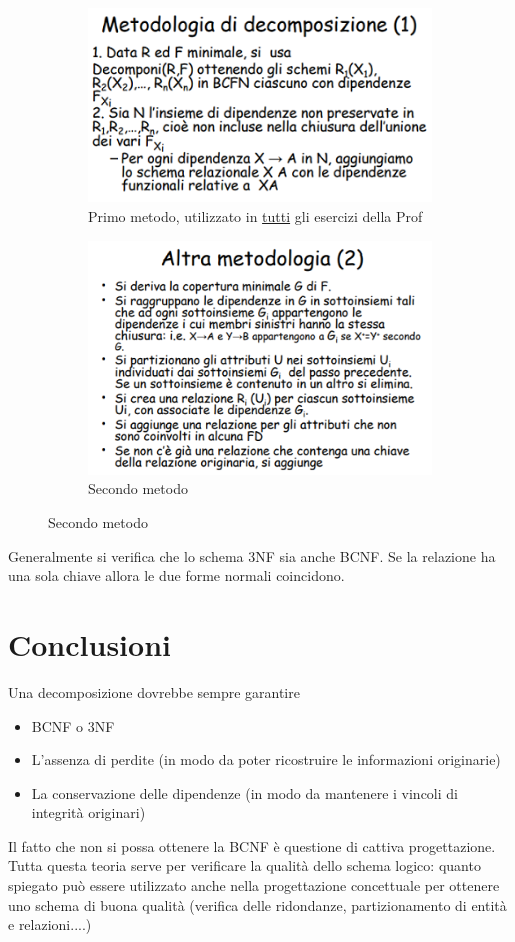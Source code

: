 \begin{figure}[h]
	\begin{subfigure}{0.5\textwidth}
		\includegraphics{images/184.PNG} 
		\caption{Primo metodo, utilizzato in \underline{tutti} gli esercizi della Prof}
	\end{subfigure}
	\begin{subfigure}{0.5\textwidth}
		\includegraphics{images/185.PNG}
		\caption{Secondo metodo}
	\end{subfigure}
\end{figure}

Generalmente si verifica che lo schema 3NF sia anche BCNF. Se la relazione ha una sola chiave allora le due forme normali coincidono.
\section{Conclusioni}
Una decomposizione dovrebbe sempre garantire
\begin{itemize}
	\item BCNF o 3NF
	\item L'assenza di perdite (in modo da poter ricostruire le informazioni originarie)
	\item La conservazione delle dipendenze (in modo da mantenere i vincoli di integrità originari)
\end{itemize}
Il fatto che non si possa ottenere la BCNF è questione di cattiva progettazione. Tutta questa teoria serve per verificare la qualità dello schema logico: quanto spiegato può essere utilizzato anche nella progettazione concettuale per ottenere uno schema di buona qualità (verifica delle ridondanze, partizionamento di entità e relazioni....)


